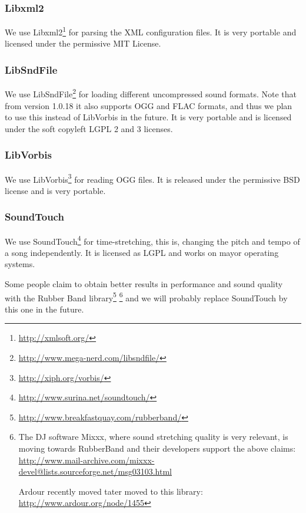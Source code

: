 \subsubsection{Libxml2}

We use Libxml2\footnote{\url{http://xmlsoft.org/}} for
parsing the XML configuration files. It is very portable and licensed
under the permissive MIT License.

\subsubsection{LibSndFile}

We use LibSndFile\footnote{\url{http://www.mega-nerd.com/libsndfile/}}
 for loading different uncompressed sound
formats. Note that from version 1.0.18 it also supports OGG and FLAC
formats, and thus we plan to use this instead of LibVorbis in the
future. It is very portable and is licensed under the soft copyleft
LGPL 2 and 3 licenses.

\subsubsection{LibVorbis}

We use LibVorbis\footnote{\url{http://xiph.org/vorbis/}} for reading
OGG files. It is released under the permissive BSD
license and is very portable.

\subsubsection{SoundTouch}

We use SoundTouch\footnote{\url{http://www.surina.net/soundtouch/}}
for time-stretching, this is, changing the pitch and
tempo of a song independently. It is licensed
as LGPL and works on mayor operating systems.

Some people claim to obtain better results in performance and sound
quality with the Rubber Band
library\footnote{\url{http://www.breakfastquay.com/rubberband/}}
\footnote{The DJ software Mixxx, where sound stretching quality is
  very relevant, is moving towards RubberBand and their developers
  support the above claims:
  \url{http://www.mail-archive.com/mixxx-devel@lists.sourceforge.net/msg03103.html}

  Ardour recently moved tater moved to this library:
  \url{http://www.ardour.org/node/1455}} and we will probably replace
SoundTouch by this one in the future.

